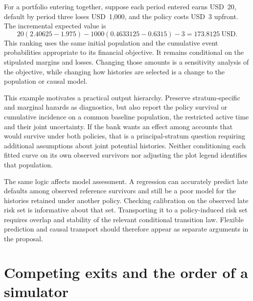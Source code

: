 For a portfolio entering together, suppose each period entered earns USD~20,
default by period three loses USD~1,000, and the policy costs USD~3 upfront.
The incremental expected value is
\begin{equation}
 20(2.40625-1.975)
 -1000(0.4633125-0.6315)-3
 =173.8125\ \mathrm{USD}.
 \label{exec17:s5-selection-value}
\end{equation}
This ranking uses the same initial population and the cumulative event
probabilities appropriate to its financial objective. It remains conditional
on the stipulated margins and losses. Changing those amounts is a sensitivity
analysis of the objective, while changing how histories are selected is a
change to the population or causal model.~\citep{exec17_s5_math}

This example motivates a practical output hierarchy. Preserve stratum-specific
and marginal hazards as diagnostics, but also report the policy survival or
cumulative incidence on a common baseline population, the restricted active
time and their joint uncertainty. If the bank wants an effect among accounts
that would survive under both policies, that is a principal-stratum question
requiring additional assumptions about joint potential histories. Neither
conditioning each fitted curve on its own observed survivors nor adjusting
the plot legend identifies that population.

The same logic affects model assessment. A regression can accurately predict
late defaults among observed reference survivors and still be a poor model
for the histories retained under another policy. Checking calibration on the
observed late risk set is informative about that set. Transporting it to a
policy-induced risk set requires overlap and stability of the relevant
conditional transition law. Flexible prediction and causal transport should
therefore appear as separate arguments in the proposal.

\section{Competing exits and the order of a simulator}
\label{exec17:s5-ordered}

